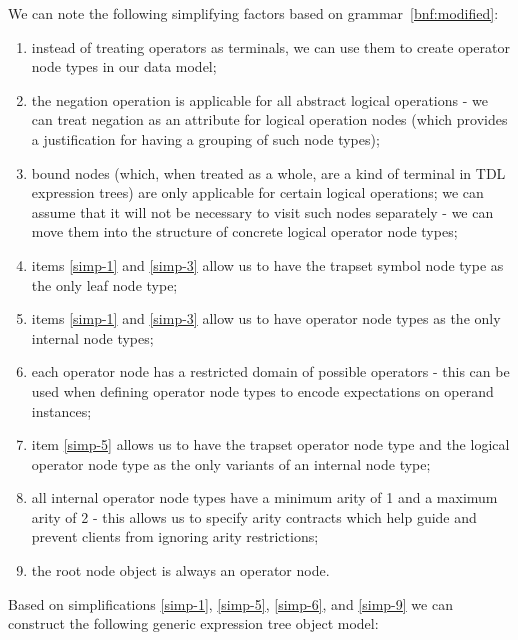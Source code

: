\documentclass[12pt,oneside,a4paper,notitlepage]{report}
\begin{document}
	\par We can note the following simplifying factors based on grammar~\ref{bnf:modified}:
	\begin{enumerate}[label=\textbf{\arabic*.},ref=\textit{\arabic*}]
		\item \label{simp-1} instead of treating operators as terminals, we can use them to create operator node types in our data model;
		\item \label{simp-2} the negation operation is applicable for all abstract logical operations - we can treat negation as an attribute for logical operation nodes (which provides a justification for having a grouping of such node types);
		\item \label{simp-3} bound nodes (which, when treated as a whole, are a kind of terminal in TDL expression trees) are only applicable for certain logical operations; we can assume that it will not be necessary to visit such nodes separately - we can move them into the structure of concrete logical operator node types;
		\item \label{simp-4} items \ref{simp-1} and \ref{simp-3} allow us to have the trapset symbol node type as the only leaf node type;
		\item \label{simp-5} items \ref{simp-1} and \ref{simp-3} allow us to have operator node types as the only internal node types;
		\item \label{simp-6} each operator node has a restricted domain of possible operators - this can be used when defining operator node types to encode expectations on operand instances;
		\item \label{simp-7} item \ref{simp-5} allows us to have the trapset operator node type and the logical operator node type as the only variants of an internal node type;
		\item \label{simp-8} all internal operator node types have a minimum arity of 1 and a maximum arity of 2 - this allows us to specify arity contracts which help guide and prevent clients from ignoring arity restrictions;
		\item \label{simp-9} the root node object is always an operator node.
	\end{enumerate}

	\newpage

	\par Based on simplifications \ref{simp-1}, \ref{simp-5}, \ref{simp-6}, and \ref{simp-9} we can construct the following generic expression tree object model:
	
\end{document}
